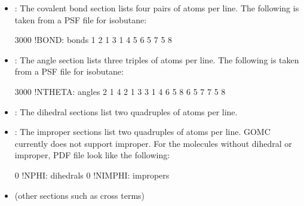 \documentclass[letterpaper,10pt,english]{sphinxmanual}
\begin{document}
\begin{itemize}
\item {} 
: The covalent bond section lists four pairs of atoms per line. The following is taken from a PSF file for isobutane:

%
\begin{sphinxVerbatim}[commandchars=\\\{\}]
3000   !BOND:     bonds
   1   2          1  3  1  4  5  6
   5   7          5  8
\end{sphinxVerbatim}

\item {} 
: The angle section lists three triples of atoms per line. The following is taken from a PSF file for isobutane:

%
\begin{sphinxVerbatim}[commandchars=\\\{\}]
3000   !NTHETA:   angles
   2   1          4  2  1  3  3  1  4
   6   5          8  6  5  7  7  5  8
\end{sphinxVerbatim}

\item {} 
: The dihedral sections list two quadruples of atoms per line.

\item {} 
: The improper sections list two quadruples of atoms per line. GOMC currently does not support improper. For the molecules without dihedral or improper, PDF file look like the following:

%
\begin{sphinxVerbatim}[commandchars=\\\{\}]
0   !NPHI: dihedrals
0   !NIMPHI: impropers
\end{sphinxVerbatim}

\item {} 
(other sections such as cross terms)

\end{itemize}
\end{document}
